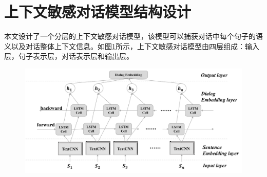 \section{上下文敏感对话模型结构设计}
本文设计了一个分层的上下文敏感对话模型，该模型可以捕获对话中每个句子的语义以及对话整体上下文信息。如图\ref{fig:model}所示，上下文敏感对话模型由四层组成：输入层，句子表示层，对话表示层和输出层。
\begin{figure}[htbp]
    \centering
    \includegraphics[width=\textwidth]{Img/dialog-model.pdf}
    \label{fig:model}
\end{figure}




